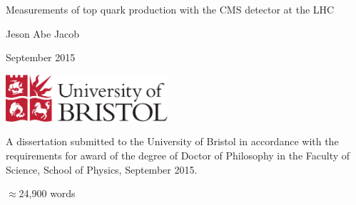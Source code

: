 \begin{titlepage}
	
	\begin{center}
		
		\vspace*{1cm}
		
		\Huge
		
		Measurements of top quark production with the CMS detector at the LHC

		\vspace{0.5cm}
		
		\large
		
		Jeson Abe Jacob
		
		\vspace{0.5cm}
		
		September 2015 %
		
		\vspace{1.5cm}
		
		\includegraphics[width=60mm]{Images/UnivShield}
		
		\vfill
		
		\normalsize
	\end{center}
	A dissertation submitted to the University of Bristol in accordance with the
	requirements for award of the degree of Doctor of Philosophy in the Faculty of
	Science, School of Physics, September 2015.

	\begin{flushright}
		$\approx$24,900 words
	\end{flushright}

\end{titlepage}